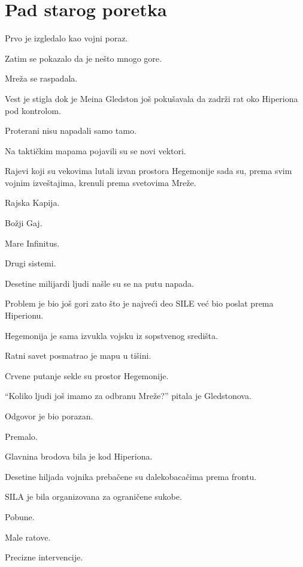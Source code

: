 
\chapter{Pad starog poretka}


Prvo je izgledalo kao vojni poraz.

Zatim se pokazalo da je nešto mnogo gore.

Mreža se raspadala.

\bigskip

Vest je stigla dok je Meina Gledston još pokušavala da zadrži rat oko Hiperiona pod kontrolom.

Proterani nisu napadali samo tamo.

Na taktičkim mapama pojavili su se novi vektori.

Rajevi koji su vekovima lutali izvan prostora Hegemonije sada su, prema svim vojnim izveštajima, krenuli prema svetovima Mreže.

Rajska Kapija.

Božji Gaj.

Mare Infinitus.

Drugi sistemi.

Desetine milijardi ljudi našle su se na putu napada.

Problem je bio još gori zato što je najveći deo SILE već bio poslat prema Hiperionu.

Hegemonija je sama izvukla vojsku iz sopstvenog središta.

\bigskip

Ratni savet posmatrao je mapu u tišini.

Crvene putanje sekle su prostor Hegemonije.

``Koliko ljudi još imamo za odbranu Mreže?'' pitala je Gledstonova.

Odgovor je bio porazan.

Premalo.

Glavnina brodova bila je kod Hiperiona.

Desetine hiljada vojnika prebačene su dalekobacačima prema frontu.

SILA je bila organizovana za ograničene sukobe.

Pobune.

Male ratove.

Precizne intervencije.

